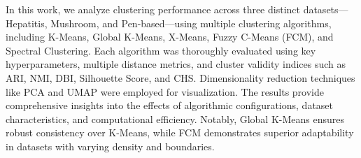 In this work, we analyze clustering performance across three distinct datasets—Hepatitis, Mushroom, and Pen-based—using multiple clustering algorithms, including K-Means, Global K-Means, X-Means, Fuzzy C-Means (FCM), and Spectral Clustering. Each algorithm was thoroughly evaluated using key hyperparameters, multiple distance metrics, and cluster validity indices such as ARI, NMI, DBI, Silhouette Score, and CHS. Dimensionality reduction techniques like PCA and UMAP were employed for visualization. The results provide comprehensive insights into the effects of algorithmic configurations, dataset characteristics, and computational efficiency. Notably, Global K-Means ensures robust consistency over K-Means, while FCM demonstrates superior adaptability in datasets with varying density and boundaries.